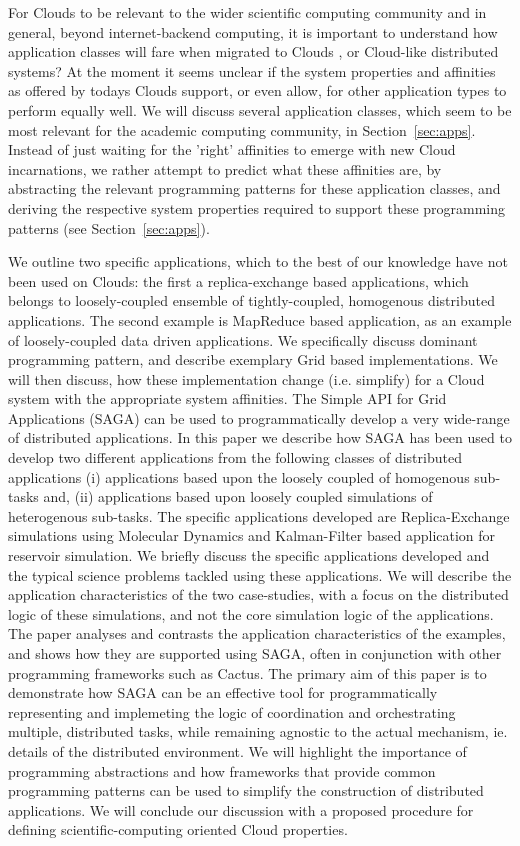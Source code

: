 \documentclass{article}
\begin{document}

For Clouds to be relevant to the wider scientific computing community
and in general, beyond internet-backend computing, it is important to
understand how application classes will fare when migrated to Clouds ,
or Cloud-like distributed systems?  At the moment it seems unclear if
the system properties and affinities as offered by todays Clouds
support, or even allow, for other application types to perform equally
well.  We will discuss several application classes, which seem to be
most relevant for the academic computing community, in
Section~\ref{sec:apps}.  Instead of just waiting for the 'right'
affinities to emerge with new Cloud incarnations, we rather attempt to
predict what these affinities are, by abstracting the relevant
programming patterns for these application classes, and deriving the
respective system properties required to support these programming
patterns (see Section~\ref{sec:apps}).
 

We outline two specific applications, which to the best of our
knowledge have not been used on Clouds: the first a replica-exchange
based applications, which belongs to loosely-coupled ensemble of
tightly-coupled, homogenous distributed applications. The second
example is MapReduce based application, as an example of
loosely-coupled data driven applications. We specifically discuss
dominant programming pattern, and describe exemplary Grid based
implementations.  We will then discuss, how these implementation
change (i.e. simplify) for a Cloud system with the appropriate system
affinities.  The Simple API for Grid Applications (SAGA) can be used
to programmatically develop a very wide-range of distributed
applications.  In this paper we describe how SAGA has been used to
develop two different applications from the following classes of
distributed applications (i) applications based upon the loosely
coupled of homogenous sub-tasks and, (ii) applications based upon
loosely coupled simulations of heterogenous sub-tasks. The specific
applications developed are Replica-Exchange simulations using
Molecular Dynamics and Kalman-Filter based application for reservoir
simulation.  We briefly discuss the specific applications developed
and the typical science problems tackled using these applications.  We
will describe the application characteristics of the two case-studies,
with a focus on the distributed logic of these simulations, and not
the core simulation logic of the applications.  The paper analyses and
contrasts the application characteristics of the examples, and shows
how they are supported using SAGA, often in conjunction with other
programming frameworks such as Cactus.  The primary aim of this paper
is to demonstrate how SAGA can be an effective tool for
programmatically representing and implemeting the logic of
coordination and orchestrating multiple, distributed tasks, while
remaining agnostic to the actual mechanism, ie. details of the
distributed environment. We will highlight the importance of
programming abstractions and how frameworks that provide common
programming patterns can be used to simplify the construction of
distributed applications. We will conclude our discussion with a
proposed procedure for defining scientific-computing oriented Cloud
properties.
\end{document}
